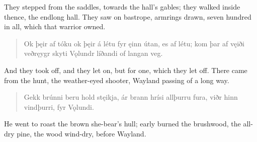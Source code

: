 \bvb They stepped from the saddles, towards the hall's gables; they walked inside thence, the endlong hall. They saw on bastrope, armrings drawn, seven hundred in all, which that warrior owned.

\begin{verse}
\bva Ok þęir af tóku \hld ok þęir á létu
fyr ęinn útan, \hld es af létu;
kom þar af vęiði \hld veðręygr skyti
Vǫlundr líðandi \hld of langan veg. \\%
\end{verse}

\bvb And they took off, and they let on, but for one, which they let off. There came from the hunt, the weather-eyed shooter, Wayland passing of a long way.

\begin{verse}
\bva Gekk brúnni \hld beru hold stęikja,
ár brann hrísi \hld allþurru fura,
viðr hinn vindþurri, \hld fyr Vǫlundi. \\%
\end{verse}

\bvb He went to roast the brown she-bear's hull; early burned the brushwood, the all-dry pine, the wood wind-dry, before Wayland.

